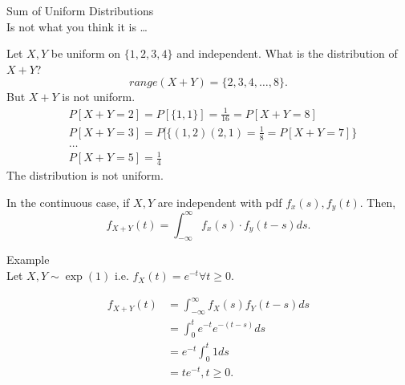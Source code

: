 \documentclass[a4paper]{article}
\begin{document}
\begin{note}{Sum of Uniform Distributions}\\
  Is not what you think it is \ldots

  Let $X,Y$ be uniform on  $\{1,2,3,4\}$ and independent. What is the distribution of $X+Y$?
   \[
  range(X+Y) = \{2,3,4,\ldots,8\} 
  .\] 
  But $X+Y$ is not uniform.
  \begin{align*}
    & P[X + Y = 2] = P[\{1,1\}] = \frac{1}{16} = P[X +Y = 8] \\
    & P[X +Y = 3] = P[\{\left( 1,2 \right) \left( 2,1 \right) = \frac{1}{8} = P[X+Y = 7] \} \\
    & \ldots \\
    & P[X+Y=5] = \frac{1}{4}
  \end{align*}
  The distribution is not uniform. 
\end{note}

\begin{definition}
  In the continuous case, if $X,Y$ are independent with pdf  $f_x\left( s \right) ,f_y(t)$. Then, 
  \[
  f_{X + Y} (t) = \int_{-\infty}^{\infty} f_x(s) \cdot f_y(t-s) ds   
  .\] 
\end{definition}

\begin{note}{Example}\\
  Let $X, Y \sim \exp(1)$ i.e. $f_X(t) = e^{-t} \forall t \geq 0$.

  \begin{align*}
    f_{X+Y}(t) &= \int_{-\infty}^{\infty} f_X(s) f_Y (t-s) ds    \\
               &= \int_0^t e^{-t} e^{-(t-s)} ds \\
               &= e^{-t} \int_0^t 1 ds \\
               &= t e^{-t}, t \geq 0
  .\end{align*}
  
\end{note}
\end{document}
